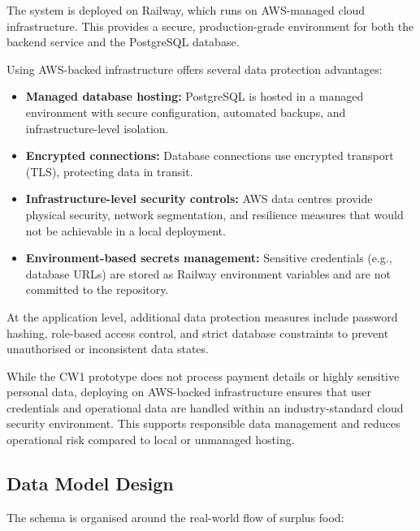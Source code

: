 \documentclass[11pt,a4paper]{article}
\begin{document}
The system is deployed on Railway, which runs on AWS-managed cloud infrastructure. This provides a secure, production-grade environment for both the backend service and the PostgreSQL database.

Using AWS-backed infrastructure offers several data protection advantages:

\begin{itemize}
    \item \textbf{Managed database hosting:} PostgreSQL is hosted in a managed environment with secure configuration, automated backups, and infrastructure-level isolation.
    \item \textbf{Encrypted connections:} Database connections use encrypted transport (TLS), protecting data in transit.
    \item \textbf{Infrastructure-level security controls:} AWS data centres provide physical security, network segmentation, and resilience measures that would not be achievable in a local deployment.
    \item \textbf{Environment-based secrets management:} Sensitive credentials (e.g., database URLs) are stored as Railway environment variables and are not committed to the repository.
\end{itemize}

At the application level, additional data protection measures include password hashing, role-based access control, and strict database constraints to prevent unauthorised or inconsistent data states.

While the CW1 prototype does not process payment details or highly sensitive personal data, deploying on AWS-backed infrastructure ensures that user credentials and operational data are handled within an industry-standard cloud security environment. This supports responsible data management and reduces operational risk compared to local or unmanaged hosting.

\subsection{Data Model Design}

The schema is organised around the real-world flow of surplus food:
\end{document}
